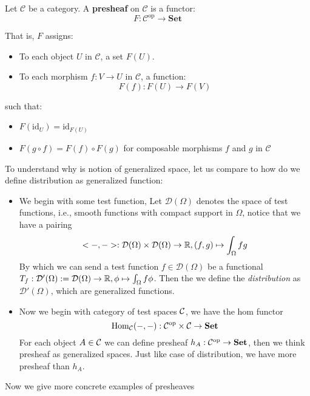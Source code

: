 \begin{definition}[Presheaf]
  Let $\mathcal{C}$ be a category. A \textbf{presheaf} on $\mathcal{C}$ is a functor:
\[
F: \mathcal{C}^{\mathrm{op}} \to \mathbf{Set}
\]

That is, $F$ assigns:
\begin{itemize}
    \item To each object $U$ in $\mathcal{C}$, a set $F(U)$.
    \item To each morphism $f: V \to U$ in $\mathcal{C}$, a function:
    \[
    F(f): F(U) \to F(V)
    \]
\end{itemize}

such that:
\begin{itemize}
    \item $F(\mathrm{id}_U) = \mathrm{id}_{F(U)}$
    \item $F(g \circ f) = F(f) \circ F(g)$ for composable morphisms $f$ and $g$ in $\mathcal{C}$
\end{itemize}
\end{definition}
\begin{remark}
  
To understand why is notion of generalized space, let us compare to how do we define distribution as generalized function: 
\begin{itemize}
  \item We begin with some test function, Let $\mathcal{D}(\Omega)$ denotes the space of test functions, i.e., smooth functions with compact support in $\Omega$, notice that we have a pairing 
    $$ <-,->:\mathcal{D}(\Omega)\times \mathcal{D}(\Omega)\to \mathbb{R}, (f,g) \mapsto \int_\Omega fg $$
    By which we can send a test function $f\in \mathcal{D}(\Omega)$ be a functional $ T_f :\mathcal{D}'(\Omega):=\mathcal{D}(\Omega)\to \mathbb{R}, \phi \mapsto \int_\Omega f\phi $. Then the we define the \emph{distribution} as $ \mathcal{D}'(\Omega)$, which are generalized functions.
  \item Now we begin with category of test spaces $\mathcal{C}$, we have the hom functor 
    \[
      \mathrm{Hom}_{\mathcal{C}}(-,-):\mathcal{C}^{\mathrm{op}} \times \mathcal{C} \to \mathbf{Set}
    \]
    For each object $A\in \mathcal{C}$ we can define presheaf $h_A: \mathcal{C}^{\mathrm{op}}  \to \mathbf{Set}$, then we think presheaf as generalized spaces. Just like case of distribution, we have more presheaf than $h_A$.
\end{itemize}

\end{remark}
Now we give more concrete examples of presheaves
\begin{example}
  
\end{example}

